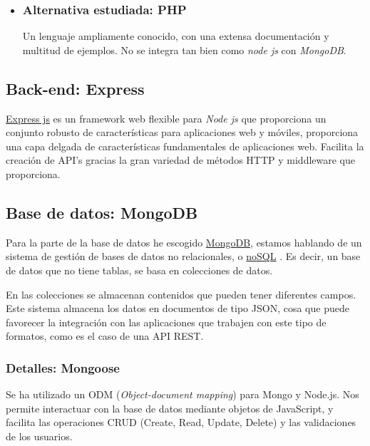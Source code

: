 \begin{itemize}
	\item \subsubsection{Alternativa estudiada: PHP}\label{php}
	Un lenguaje ampliamente conocido, con una extensa documentación y multitud de ejemplos. No se integra tan bien como \emph{node js} con \emph{MongoDB}. 

\end{itemize}



\subsection{Back-end: Express }\label{tecnologias_expressjs}
\hyperlink{http://expressjs.com/}{Express js} es un framework web flexible para \emph{Node js} que proporciona un conjunto robusto de características para aplicaciones web y móviles, proporciona una capa delgada de características fundamentales de aplicaciones web. Facilita la creación de API’s gracias la gran variedad de métodos HTTP y middleware que proporciona.


\subsection{Base de datos: MongoDB}\label{tecnologias_mongodb}
Para la parte de la base de datos he escogido \hyperlink{https://www.mongodb.com/}{MongoDB}, estamos hablando de un sistema de gestión de bases de datos no relacionales, o \hyperlink{https://es.wikipedia.org/wiki/NoSQL}{noSQL} . Es decir, un base de datos que no tiene tablas, se basa en colecciones de datos.

En las colecciones se almacenan contenidos que pueden tener diferentes campos. Este sistema almacena los datos en documentos de tipo JSON, cosa que puede favorecer la integración con las aplicaciones que trabajen con este tipo de formatos, como es el caso de una API REST. 


\subsubsection{Detalles: Mongoose}\label{mongoose}
Se ha utilizado un ODM (\emph{Object-document mapping}) para Mongo y Node.js. Nos permite interactuar con la base de datos mediante objetos de JavaScript, y facilita las operaciones CRUD (Create, Read, Update, Delete) y las validaciones de los usuarios.


